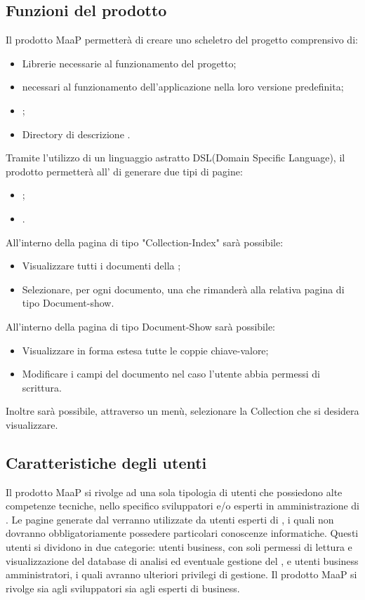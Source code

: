 \subsection{Funzioni del prodotto} %
Il prodotto MaaP permetterà di creare uno scheletro del progetto comprensivo di:
\begin{itemize}
\item Librerie necessarie al funzionamento del progetto;
\item {} necessari al funzionamento dell'applicazione nella loro versione predefinita;
\item {};
\item Directory di descrizione .
\end{itemize}
Tramite l'utilizzo di un linguaggio astratto DSL(Domain Specific Language), il prodotto permetterà all' di generare due tipi di pagine:
\begin{itemize}
\item {};
\item {}.
\end{itemize}

All'interno della pagina di tipo "Collection-Index" sarà possibile:
\begin{itemize}
\item Visualizzare tutti i documenti della ;
\item Selezionare, per ogni documento, una  che rimanderà alla relativa pagina di tipo Document-show.
\end{itemize}

All'interno della pagina di tipo Document-Show sarà possibile:
\begin{itemize}
\item Visualizzare in forma estesa tutte le coppie chiave-valore;
\item Modificare i campi del documento nel caso l'utente abbia permessi di scrittura.
\end{itemize}

Inoltre sarà possibile, attraverso un menù, selezionare la Collection che si desidera visualizzare.

\subsection{Caratteristiche degli utenti}
Il prodotto MaaP si rivolge ad una sola tipologia di utenti che possiedono alte competenze tecniche, nello specifico sviluppatori e/o esperti in amministrazione di . Le pagine generate dal  verranno utilizzate da utenti esperti di , i quali non dovranno obbligatoriamente possedere particolari conoscenze informatiche. Questi utenti si dividono in due categorie: utenti business, con soli permessi di lettura e visualizzazione del database di analisi ed eventuale gestione del , e utenti business amministratori, i quali avranno ulteriori privilegi di gestione.
Il prodotto MaaP si rivolge sia agli sviluppatori sia agli esperti di business.

